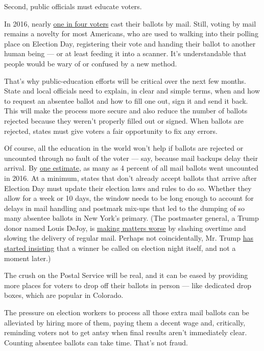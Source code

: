 Second, public officials must educate voters.

In 2016, nearly
\href{https://www.eac.gov/documents/2017/10/17/eavs-deep-dive-early-absentee-and-mail-voting-data-statutory-overview}{one
in four voters} cast their ballots by mail. Still, voting by mail
remains a novelty for most Americans, who are used to walking into their
polling place on Election Day, registering their vote and handing their
ballot to another human being --- or at least feeding it into a scanner.
It's understandable that people would be wary of or confused by a new
method.

That's why public-education efforts will be critical over the next few
months. State and local officials need to explain, in clear and simple
terms, when and how to request an absentee ballot and how to fill one
out, sign it and send it back. This will make the process more secure
and also reduce the number of ballots rejected because they weren't
properly filled out or signed. When ballots are rejected, states must
give voters a fair opportunity to fix any errors.

Of course, all the education in the world won't help if ballots are
rejected or uncounted through no fault of the voter --- say, because
mail backups delay their arrival. By
\href{https://papers.ssrn.com/sol3/papers.cfm?abstract_id=3660625}{one
estimate}, as many as 4 percent of all mail ballots went uncounted in
2016. At a minimum, states that don't already accept ballots that arrive
after Election Day must update their election laws and rules to do so.
Whether they allow for a week or 10 days, the window needs to be long
enough to account for delays in mail handling and postmark mix-ups that
led to the dumping of so many absentee ballots in New York's primary.
(The postmaster general, a Trump donor named Louis DeJoy, is
\href{https://www.npr.org/2020/07/29/894799516/pending-postal-service-changes-could-delay-mail-and-deliveries-advocates-warn}{making
matters worse} by slashing overtime and slowing the delivery of regular
mail. Perhaps not coincidentally, Mr. Trump
\href{https://twitter.com/realDonaldTrump/status/1288933078287745024?s=20}{has
started insisting} that a winner be called on election night itself, and
not a moment later.)

The crush on the Postal Service will be real, and it can be eased by
providing more places for voters to drop off their ballots in person ---
like dedicated drop boxes, which are popular in Colorado.

The pressure on election workers to process all those extra mail ballots
can be alleviated by hiring more of them, paying them a decent wage and,
critically, reminding voters not to get antsy when final results aren't
immediately clear. Counting absentee ballots can take time. That's not
fraud.

